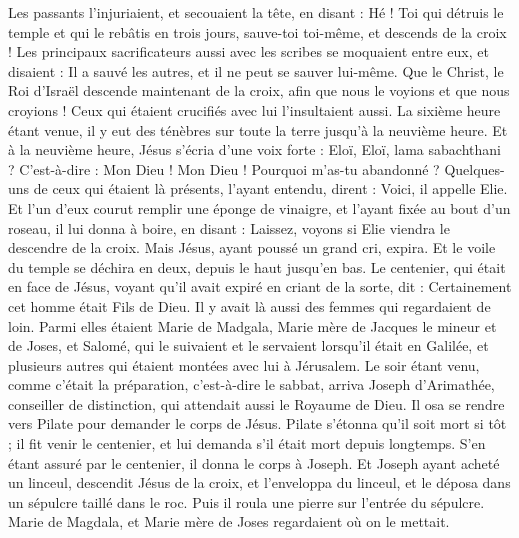 \begin{multicols}{2}
Les passants l’injuriaient, et secouaient la tête, en disant : Hé ! Toi qui détruis le temple et qui le rebâtis en trois jours,
sauve-toi toi-même, et descends de la croix !
Les principaux sacrificateurs aussi avec les scribes se moquaient entre eux, et disaient : Il a sauvé les autres, et il ne peut se sauver lui-même.
Que le Christ, le Roi d’Israël descende maintenant de la croix, afin que nous le voyions et que nous croyions ! Ceux qui étaient crucifiés avec lui l’insultaient aussi.
La sixième heure étant venue, il y eut des ténèbres sur toute la terre jusqu'à la neuvième heure.
Et à la neuvième heure, Jésus s’écria d’une voix forte : Eloï, Eloï, lama sabachthani ? C’est-à-dire : Mon Dieu ! Mon Dieu ! Pourquoi m'as-tu abandonné ?
Quelques-uns de ceux qui étaient là présents, l’ayant entendu, dirent : Voici, il appelle Elie.
Et l’un d’eux courut remplir une éponge de vinaigre{}, et l'ayant fixée au bout d'un roseau, il lui donna à boire, en disant : Laissez, voyons si Elie viendra le descendre de la croix.
Mais Jésus, ayant poussé un grand cri, expira.
Et le voile du temple se déchira en deux, depuis le haut jusqu'en bas{}.
Le centenier, qui était en face de Jésus, voyant qu'il avait expiré en criant de la sorte, dit : Certainement cet homme était Fils de Dieu.
Il y avait là aussi des femmes qui regardaient de loin. Parmi elles étaient Marie de Madgala, Marie mère de Jacques le mineur et de Joses, et Salomé,
qui le suivaient et le servaient lorsqu'il était en Galilée, et plusieurs autres qui étaient montées avec lui à Jérusalem.
Le soir étant venu, comme c'était la préparation, c’est-à-dire le sabbat,
arriva Joseph d'Arimathée, conseiller de distinction, qui attendait aussi le Royaume de Dieu. Il osa se rendre vers Pilate pour demander le corps de Jésus.
Pilate s'étonna qu'il soit mort si tôt ; il fit venir le centenier, et lui demanda s'il était mort depuis longtemps.
S’en étant assuré par le centenier, il donna le corps à Joseph.
Et Joseph ayant acheté un linceul, descendit Jésus de la croix, et l'enveloppa du linceul, et le déposa dans un sépulcre taillé dans le roc. Puis il roula une pierre sur l'entrée du sépulcre.
Marie de Magdala, et Marie mère de Joses regardaient où on le mettait.
\end{multicols}
